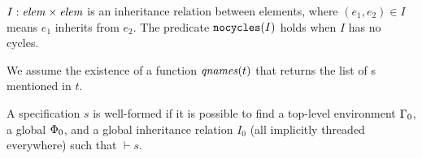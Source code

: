 \documentclass{article}
\begin{document}
$I : \mathit{elem} \times \mathit{elem}$ is an inheritance relation between elements, where $(e_1,e_2) \in I$ means
$e_1$ inherits from $e_2$. The predicate $\texttt{nocycles}({I})$ holds when $I$ has no cycles. 

We assume the existence of a function $\mathit{qnames}({t})$ that returns the list of s mentioned in  $t$.


\newcommand{\validinh}[2]{\texttt{valid-inherit}({#1},{#2})}
\newcommand{\validclient}[2]{\texttt{valid-client}({#1},{#2})}
\newcommand{\validcontains}[2]{\texttt{valid-contains}({#1},{#2})}

\newcommand{\wb}[3]{{#1} \vdash {#2} \Rightarrow {#3}}
\newcommand{\wbx}[2]{{#1} \vdash {#2}}

A specification $s$ is well-formed if it is possible to find a top-level environment $\Gamma_0$, a global $\Phi_0$,
and a global inheritance relation $I_0$ (all implicitly threaded everywhere) such that $\wbx{}{s}$.
\end{document}
